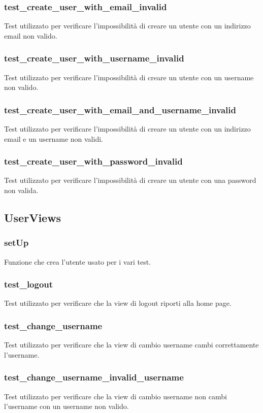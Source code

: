 \subsubsection{test\_create\_user\_with\_email\_invalid}
Test utilizzato per verificare l'impossibilità di creare un utente con un indirizzo email non valido.

\subsubsection{test\_create\_user\_with\_username\_invalid}
Test utilizzato per verificare l'impossibilità di creare un utente con un username non valido.

\subsubsection{test\_create\_user\_with\_email\_and\_username\_invalid}
Test utilizzato per verificare l'impossibilità di creare un utente con un indirizzo email e un username non validi.

\subsubsection{test\_create\_user\_with\_password\_invalid}
Test utilizzato per verificare l'impossibilità di creare un utente con una password non valida.

\subsection{UserViews}
\subsubsection{setUp}
Funzione che crea l'utente usato per i vari test.

\subsubsection{test\_logout}
Test utilizzato per verificare che la view di logout riporti alla home page.

\subsubsection{test\_change\_username}
Test utilizzato per verificare che la view di cambio username cambi correttamente l'username.

\subsubsection{test\_change\_username\_invalid\_username}
Test utilizzato per verificare che la view di cambio username non cambi l'username con un username non valido.

